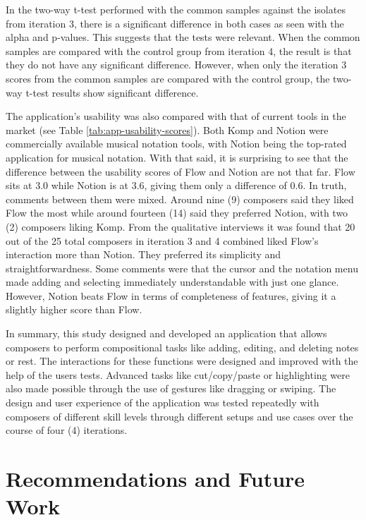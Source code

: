 		In the two-way t-test performed with the common samples against the isolates from iteration 3, there is a significant difference in both cases as seen with the alpha and p-values. This suggests that the tests were relevant. When the common samples are compared with the control group from iteration 4, the result is that they do not have any significant difference. However, when only the iteration 3 scores from the common samples are compared with the control group, the two-way t-test results show significant difference. 

		The application's usability was also compared with that of current tools in the market (see Table \ref{tab:app-usability-scores}). Both Komp and Notion were commercially available musical notation tools, with Notion being the top-rated application for musical notation. With that said, it is surprising to see that the difference between the usability scores of Flow and Notion are not that far. Flow sits at 3.0 while Notion is at 3.6, giving them only a difference of 0.6. In truth, comments between them were mixed. Around nine (9) composers said they liked Flow the most while around fourteen (14) said they preferred Notion, with two (2) composers liking Komp. From the qualitative interviews it was found that 20 out of the 25 total composers in iteration 3 and 4 combined liked Flow's interaction more than Notion. They preferred its simplicity and straightforwardness. Some comments were that the cursor and the notation menu made adding and selecting immediately understandable with just one glance. However, Notion beats Flow in terms of completeness of features, giving it a slightly higher score than Flow. 

		In summary, this study designed and developed an application that allows composers to perform compositional tasks like adding, editing, and deleting notes or rest. The interactions for these functions were designed and improved with the help of the users tests. Advanced tasks like cut/copy/paste or highlighting were also made possible through the use of gestures like dragging or swiping. The design and user experience of the application was tested repeatedly with composers of different skill levels through different setups and use cases over the course of four (4) iterations. 
		
	\section{Recommendations and Future Work}

